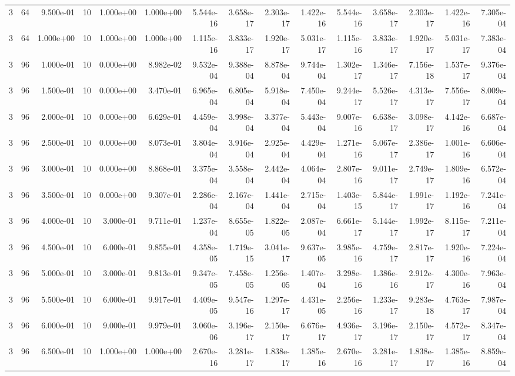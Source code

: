 \begin{tabular}{rrrrrrrrrrrrrrr}
3 & 64 & 9.500e-01 & 10 & 1.000e+00 & 1.000e+00 & 5.544e-16 & 3.658e-17 & 2.303e-17 & 1.422e-16 & 5.544e-16 & 3.658e-17 & 2.303e-17 & 1.422e-16 & 7.305e-04 \\
3 & 64 & 1.000e+00 & 10 & 1.000e+00 & 1.000e+00 & 1.115e-16 & 3.833e-17 & 1.920e-17 & 5.031e-17 & 1.115e-16 & 3.833e-17 & 1.920e-17 & 5.031e-17 & 7.383e-04 \\
3 & 96 & 1.000e-01 & 10 & 0.000e+00 & 8.982e-02 & 9.532e-04 & 9.388e-04 & 8.878e-04 & 9.744e-04 & 1.302e-17 & 1.346e-17 & 7.156e-18 & 1.537e-17 & 9.376e-04 \\
3 & 96 & 1.500e-01 & 10 & 0.000e+00 & 3.470e-01 & 6.965e-04 & 6.805e-04 & 5.918e-04 & 7.450e-04 & 9.244e-17 & 5.526e-17 & 4.313e-17 & 7.556e-17 & 8.009e-04 \\
3 & 96 & 2.000e-01 & 10 & 0.000e+00 & 6.629e-01 & 4.459e-04 & 3.998e-04 & 3.377e-04 & 5.443e-04 & 9.007e-16 & 6.638e-17 & 3.098e-17 & 4.142e-16 & 6.687e-04 \\
3 & 96 & 2.500e-01 & 10 & 0.000e+00 & 8.073e-01 & 3.804e-04 & 3.916e-04 & 2.925e-04 & 4.429e-04 & 1.271e-16 & 5.067e-17 & 2.386e-17 & 1.001e-16 & 6.606e-04 \\
3 & 96 & 3.000e-01 & 10 & 0.000e+00 & 8.868e-01 & 3.375e-04 & 3.558e-04 & 2.442e-04 & 4.064e-04 & 2.807e-16 & 9.011e-17 & 2.749e-17 & 1.809e-16 & 6.572e-04 \\
3 & 96 & 3.500e-01 & 10 & 0.000e+00 & 9.307e-01 & 2.286e-04 & 2.167e-04 & 1.441e-04 & 2.715e-04 & 1.403e-15 & 5.844e-17 & 1.991e-17 & 1.192e-16 & 7.241e-04 \\
3 & 96 & 4.000e-01 & 10 & 3.000e-01 & 9.711e-01 & 1.237e-04 & 8.655e-05 & 1.822e-05 & 2.087e-04 & 6.661e-17 & 5.144e-17 & 1.992e-17 & 8.115e-17 & 7.211e-04 \\
3 & 96 & 4.500e-01 & 10 & 6.000e-01 & 9.855e-01 & 4.358e-05 & 1.719e-15 & 3.041e-17 & 9.637e-05 & 3.985e-16 & 4.759e-17 & 2.817e-17 & 1.920e-16 & 7.224e-04 \\
3 & 96 & 5.000e-01 & 10 & 3.000e-01 & 9.813e-01 & 9.347e-05 & 7.458e-05 & 1.256e-05 & 1.407e-04 & 3.298e-16 & 1.386e-16 & 2.912e-17 & 4.300e-16 & 7.963e-04 \\
3 & 96 & 5.500e-01 & 10 & 6.000e-01 & 9.917e-01 & 4.409e-05 & 9.547e-16 & 1.297e-17 & 4.431e-05 & 2.256e-16 & 1.233e-17 & 9.283e-18 & 4.763e-17 & 7.987e-04 \\
3 & 96 & 6.000e-01 & 10 & 9.000e-01 & 9.979e-01 & 3.060e-06 & 3.196e-17 & 2.150e-17 & 6.676e-17 & 4.936e-17 & 3.196e-17 & 2.150e-17 & 4.572e-17 & 8.347e-04 \\
3 & 96 & 6.500e-01 & 10 & 1.000e+00 & 1.000e+00 & 2.670e-16 & 3.281e-17 & 1.838e-17 & 1.385e-16 & 2.670e-16 & 3.281e-17 & 1.838e-17 & 1.385e-16 & 8.859e-04 \\

\end{tabular}
